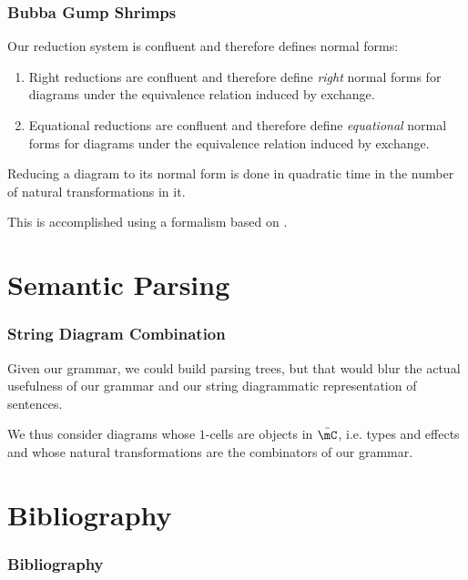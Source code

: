 \documentclass[math, english, info]{beamercours}
\begin{document}
\begin{frame}[allowframebreaks]
	\frametitle{Bubba Gump Shrimps}
	\begin{thm}[Confluence]\label{thm:confluence}
		Our reduction system is confluent and therefore defines normal forms:
		\begin{enumerate}
			\item Right reductions are confluent and therefore define \emph{right} normal forms for
			      diagrams under the equivalence relation induced by exchange.
			\item Equational reductions are confluent and therefore define \emph{equational}
			      normal forms for diagrams under the equivalence relation induced by exchange.
		\end{enumerate}
	\end{thm}

	\smallskip

	\begin{thm}
		\label{thm:normalize}
		Reducing a diagram to its normal form is done in quadratic time in
		the number of natural transformations in it.
	\end{thm}
	This is accomplished using a formalism based on \cite{delpeuchNormalizationPlanarString2022}.
\end{frame}

\section{Semantic Parsing}

\begin{frame}
	\frametitle{String Diagram Combination}
	Given our grammar, we could build parsing trees, but that would blur the actual usefulness of our grammar and our string diagrammatic representation of sentences.

	\medskip

	We thus consider diagrams whose $1$-cells are objects in $\bar{\mC}$, i.e. types and effects and whose natural transformations are the combinators of our grammar.
\end{frame}


\section*{Bibliography}

\begin{frame}[allowframebreaks]
	\frametitle{Bibliography}
	\printbibliography{}
\end{frame}
\end{document}
